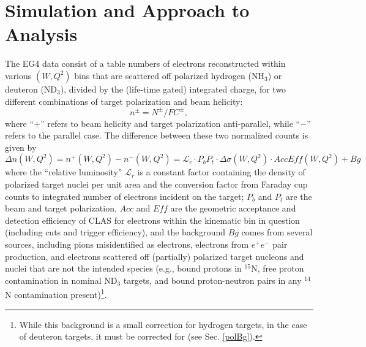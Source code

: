 \section{Simulation and Approach to Analysis}


The EG4 data consist of a table %
numbers of electrons reconstructed %
within various $(W,Q^2)$ bins that are scattered off polarized hydrogen (NH$_3$) or deuteron  (ND$_3$), divided by the (life-time gated) integrated charge, for two different combinations of target polarization and beam helicity:
\begin{equation}
n^{\pm} = N^{\pm}/FC^{\pm} ,
\end{equation}
where ``$+$''  refers to beam helicity and target polarization %
anti-parallel, while ``$-$'' refers to the parallel case. The difference between these two normalized counts is given by
\begin{equation}
\label{Delndef}
\Delta n (W,Q^2) = n^+ (W,Q^2) - n^- (W,Q^2) = {\mathcal L}_r  \cdot P_b P_t \cdot \Delta \sigma (W,Q^2)  \cdot Acc  Eff (W,Q^2) + Bg
\end{equation}
where the ``relative luminosity'' ${\mathcal L}_r$ is a constant factor containing the density of polarized target nuclei per
unit area and the conversion factor from Faraday cup counts to integrated number of electrons incident on the target; $P_b$ and $P_t$ are the beam and target polarization, $Acc$ and $Eff$ are the geometric  acceptance and detection efficiency of CLAS for electrons within the kinematic bin in question (including cuts and trigger efficiency), and the background $Bg$ comes from several sources, including pions misidentified as electrons, electrons from $e^+e^-$ pair production, and electrons scattered off (partially) polarized target nucleons and nuclei that are not the intended species (e.g., bound protons in $^{15}$N, free proton contamination in nominal ND$_3$ targets, and bound proton-neutron pairs in any $^{14}$N contamination present)\footnote{While this background is a small correction for hydrogen targets, in the case of deuteron targets, it must be corrected for (see Sec. \ref{polBg}). %
}.




